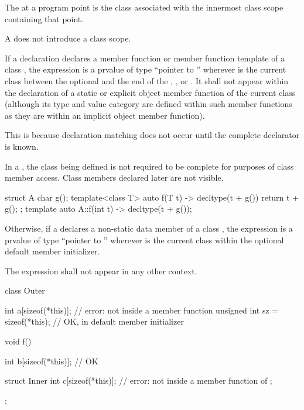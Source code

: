 \pnum
The  at a program point is
the class associated with the innermost class scope containing that point.
\begin{note}
A  does not introduce a class scope.
\end{note}

\pnum
If a declaration declares a member function or member function template of a
class , the expression  is a prvalue of type ``pointer to
 ''
wherever  is the current class
between the optional
 and the end of the ,
, or . It shall not appear within
the declaration of
a static or explicit object member function
of the current class (although its type and value category
are defined within such member functions as they are within an implicit object
member function).
\begin{note}
This is because declaration matching does not
occur until the complete declarator is known.
\end{note}
\begin{note}
In a ,
the class being defined is not required to be complete
for purposes of class member access.
Class members declared later are not visible.
\begin{example}
\begin{codeblock}
struct A {
  char g();
  template<class T> auto f(T t) -> decltype(t + g())
    { return t + g(); }
};
template auto A::f(int t) -> decltype(t + g());
\end{codeblock}
\end{example}
\end{note}

\pnum
Otherwise, if a  declares a non-static data
member of a class , the expression  is
a prvalue of type ``pointer to ''
wherever  is the current class
within the
optional default member initializer.

\pnum
The expression  shall not appear in any other context.
\begin{example}
\begin{codeblock}
class Outer {
  int a[sizeof(*this)];                 // error: not inside a member function
  unsigned int sz = sizeof(*this);      // OK, in default member initializer

  void f() {
    int b[sizeof(*this)];               // OK

    struct Inner {
      int c[sizeof(*this)];             // error: not inside a member function of 
    };
  }
};
\end{codeblock}
\end{example}

